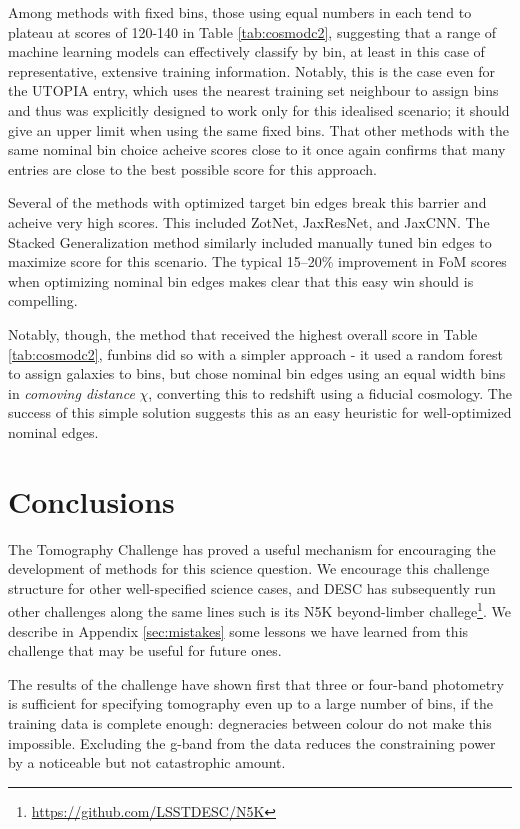 \documentclass[twocolumn,twocolappendix]{aastex63}
\begin{document}
Among methods with fixed bins, those using equal numbers in each tend to plateau at scores of
120-140 in Table \ref{tab:cosmodc2}, suggesting that a range of machine learning models can
effectively classify by bin, at least in this case of representative, extensive training
information.  Notably, this is the case even for the UTOPIA entry, which uses the nearest 
training set neighbour to assign bins and thus was explicitly designed to work only
for this idealised scenario; it should give an upper limit when using the same fixed bins.
That other methods with the same nominal bin choice acheive scores close to it once again
confirms that many entries are close to the best possible score for this approach.


Several of the methods with optimized target bin edges break this
barrier and acheive very high scores.  This included ZotNet, JaxResNet, and JaxCNN.  The
Stacked Generalization method similarly included manually tuned bin edges to maximize
score for this scenario. The typical 15--20\% improvement in FoM scores when optimizing
nominal bin edges makes clear that this easy win should is compelling.

Notably, though, the method that received the highest overall score in Table \ref{tab:cosmodc2}, 
{\sc funbins} did so with a simpler approach - it used a random forest to assign galaxies to bins,
but chose nominal bin edges using an equal width bins in \emph{comoving distance} $\chi$, converting
this to redshift using a fiducial cosmology. The success of this simple solution suggests this
as an easy heuristic for well-optimized nominal edges.

\section{Conclusions}
The Tomography Challenge has proved a useful mechanism for encouraging the development
of methods for this science question.  We encourage this challenge structure for other
well-specified science cases, and DESC has subsequently run other challenges along the same lines
such is its N5K beyond-limber challege\footnote{\url{https://github.com/LSSTDESC/N5K}}.
We describe in Appendix \ref{sec:mistakes} some lessons we have learned from this challenge
that may be useful for future ones.

The results of the challenge have shown first that three or four-band photometry
is sufficient for specifying tomography even up to a large number of bins, if
the training data is complete enough: degneracies between colour do not make this impossible.
Excluding the g-band from the data reduces the constraining power by a noticeable but
not catastrophic amount.
\end{document}
